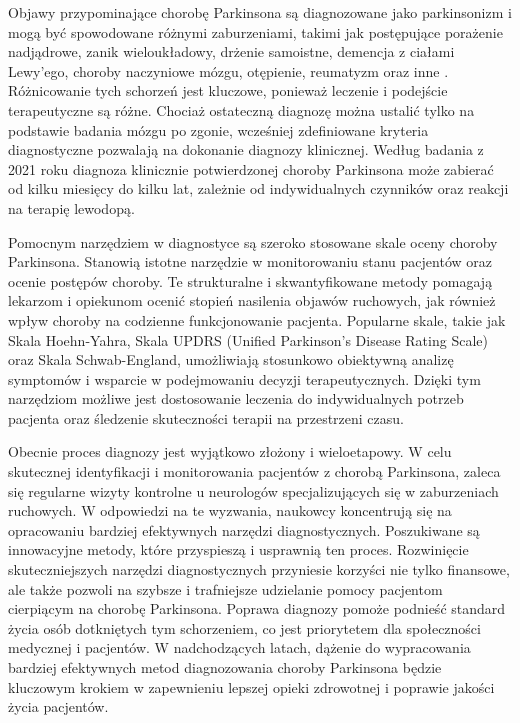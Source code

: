 Objawy przypominające chorobę Parkinsona są diagnozowane jako parkinsonizm i mogą być spowodowane różnymi zaburzeniami, takimi jak postępujące porażenie nadjądrowe, zanik wieloukładowy,
drżenie samoistne, demencja z ciałami Lewy'ego, choroby naczyniowe mózgu, otępienie, reumatyzm oraz inne \cite{diagnostyka_Sitek}.
Różnicowanie tych schorzeń jest kluczowe, ponieważ leczenie i podejście terapeutyczne są różne.
Chociaż ostateczną diagnozę można ustalić tylko na podstawie badania mózgu po zgonie, wcześniej zdefiniowane kryteria diagnostyczne pozwalają na dokonanie diagnozy klinicznej.
Według badania z 2021 roku \cite{ROSSI202153} diagnoza klinicznie potwierdzonej choroby Parkinsona może zabierać od kilku miesięcy do kilku lat, zależnie od indywidualnych czynników oraz reakcji na terapię lewodopą.

Pomocnym narzędziem w diagnostyce są szeroko stosowane skale oceny choroby Parkinsona.
Stanowią istotne narzędzie w monitorowaniu stanu pacjentów oraz ocenie postępów choroby.
Te strukturalne i skwantyfikowane metody pomagają lekarzom i opiekunom ocenić stopień nasilenia objawów ruchowych,
jak również wpływ choroby na codzienne funkcjonowanie pacjenta.
Popularne skale, takie jak Skala Hoehn-Yahra, Skala UPDRS (Unified Parkinson's Disease Rating Scale) oraz Skala Schwab-England,
umożliwiają stosunkowo obiektywną analizę symptomów i wsparcie w podejmowaniu decyzji terapeutycznych.
Dzięki tym narzędziom możliwe jest dostosowanie leczenia do indywidualnych potrzeb pacjenta oraz śledzenie skuteczności terapii na przestrzeni czasu.

Obecnie proces diagnozy jest wyjątkowo złożony i wieloetapowy.
W celu skutecznej identyfikacji i monitorowania pacjentów z chorobą Parkinsona, zaleca się regularne wizyty kontrolne u neurologów specjalizujących
się w zaburzeniach ruchowych.
W odpowiedzi na te wyzwania, naukowcy koncentrują się na opracowaniu bardziej efektywnych narzędzi diagnostycznych.
Poszukiwane są innowacyjne metody, które przyspieszą i usprawnią ten proces.
Rozwinięcie skuteczniejszych narzędzi diagnostycznych przyniesie korzyści nie tylko finansowe, ale także pozwoli na szybsze i trafniejsze udzielanie pomocy pacjentom cierpiącym na chorobę Parkinsona.
Poprawa diagnozy pomoże podnieść standard życia osób dotkniętych tym schorzeniem, co jest priorytetem dla społeczności medycznej i pacjentów.
W nadchodzących latach, dążenie do wypracowania bardziej efektywnych metod diagnozowania choroby Parkinsona będzie kluczowym krokiem w zapewnieniu lepszej opieki zdrowotnej i poprawie jakości życia pacjentów.

